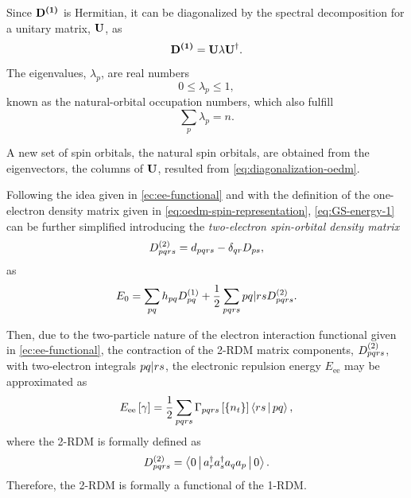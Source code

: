 Since $ \boldsymbol{\mathrm{D^{\left( 1 \right)}}}$ is Hermitian, it can be diagonalized by the spectral
decomposition for a unitary matrix, $ \boldsymbol{\mathrm{U}}$, as
\begin{equation} \label{eq:diagonalization-oedm}
    \boldsymbol{\mathrm{D^{\left( 1 \right)}}} =
    \boldsymbol{\mathrm{U}} \lambda \boldsymbol{\mathrm{U}}^{\dagger}
    .
\end{equation}

The eigenvalues, $\lambda_p$, are real numbers 
\begin{equation}
    0 \le \lambda_p \le 1
    ,
\end{equation}
known as the natural-orbital occupation numbers, which also fulfill 
\begin{equation}
    \sum_{p} \lambda_p = n
    .
\end{equation}

A new set of spin orbitals, the natural spin orbitals, are obtained from the
eigenvectors, the columns of $ \boldsymbol{\mathrm{U}}$, resulted from 
\cref{eq:diagonalization-oedm}.

Following the idea given in \cref{ec:ee-functional} and 
with the definition of the one-electron density matrix given in 
\cref{eq:oedm-spin-representation}, \cref{eq:GS-energy-1} can be further
simplified introducing the \textit{two-electron spin-orbital density matrix}
\begin{equation} \label{eq:tedm-spin-representation}
    D^{\left( 2 \right)}_{pqrs} = d_{pqrs} - \delta_{qr} D_{ps}
    ,
\end{equation}
as
\begin{equation} \label{eq:GS-energy-2}
    E_0 =
    \sum_{pq} h_{pq} \oedm_{pq} + \frac{1}{2} \sum_{pqrs}
    \PBraket{pq | rs} \tedm_{pqrs}
    .
\end{equation}

Then, due to the two-particle nature of the electron interaction functional
given in \cref{ec:ee-functional}, the contraction of the 2-RDM matrix components,
$D^{\left( 2 \right)}_{pqrs}$, with two-electron integrals $\PBraket{pq | rs}$, the
electronic repulsion energy $E_{\text{ee}}$ may be approximated as
\begin{equation}
    E_{\text{ee}} \left[ \fordm \right]
    =
    \frac{1}{2} \sum_{pqrs}
    \sordm_{pqrs}\left[ \left\{ n_t \right\} \right] 
    \Braket{rs | pq}
    ,
\end{equation}
where the 2-RDM is formally defined as 
\begin{equation}
    \tedm_{pqrs} = \Braket{0 | a_r^{\dagger} a_s^{\dagger} a_q a_p | 0}
    .
\end{equation}
Therefore, the 2-RDM is formally a functional of the 1-RDM. %

